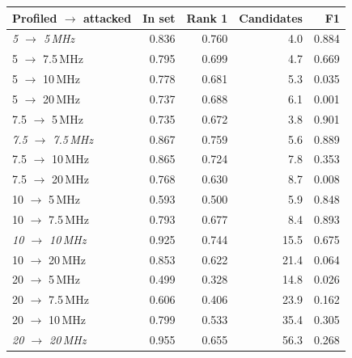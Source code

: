 \begin{tabular}{lrrrr}
\hline
Profiled $\to$ attacked & In set & Rank 1 & Candidates & F1 \\
\hline
\textit{5 $\to$ 5\,MHz} & 0.836 & 0.760 & 4.0 & 0.884 \\
5 $\to$ 7.5\,MHz & 0.795 & 0.699 & 4.7 & 0.669 \\
5 $\to$ 10\,MHz & 0.778 & 0.681 & 5.3 & 0.035 \\
5 $\to$ 20\,MHz & 0.737 & 0.688 & 6.1 & 0.001 \\
\hline
7.5 $\to$ 5\,MHz & 0.735 & 0.672 & 3.8 & 0.901 \\
\textit{7.5 $\to$ 7.5\,MHz} & 0.867 & 0.759 & 5.6 & 0.889 \\
7.5 $\to$ 10\,MHz & 0.865 & 0.724 & 7.8 & 0.353 \\
7.5 $\to$ 20\,MHz & 0.768 & 0.630 & 8.7 & 0.008 \\
\hline
10 $\to$ 5\,MHz & 0.593 & 0.500 & 5.9 & 0.848 \\
10 $\to$ 7.5\,MHz & 0.793 & 0.677 & 8.4 & 0.893 \\
\textit{10 $\to$ 10\,MHz} & 0.925 & 0.744 & 15.5 & 0.675 \\
10 $\to$ 20\,MHz & 0.853 & 0.622 & 21.4 & 0.064 \\
\hline
20 $\to$ 5\,MHz & 0.499 & 0.328 & 14.8 & 0.026 \\
20 $\to$ 7.5\,MHz & 0.606 & 0.406 & 23.9 & 0.162 \\
20 $\to$ 10\,MHz & 0.799 & 0.533 & 35.4 & 0.305 \\
\textit{20 $\to$ 20\,MHz} & 0.955 & 0.655 & 56.3 & 0.268 \\
\hline
\end{tabular}
